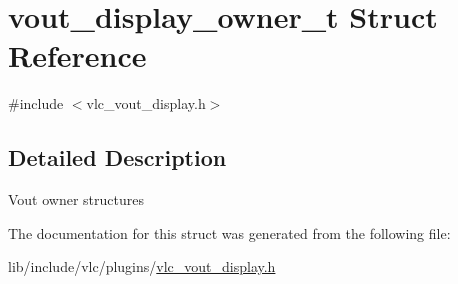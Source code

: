 \hypertarget{structvout__display__owner__t}{}\section{vout\+\_\+display\+\_\+owner\+\_\+t Struct Reference}
\label{structvout__display__owner__t}


{\ttfamily \#include $<$vlc\+\_\+vout\+\_\+display.\+h$>$}



\subsection{Detailed Description}
Vout owner structures 

The documentation for this struct was generated from the following file\+:\begin{DoxyCompactItemize}
\item 
lib/include/vlc/plugins/\hyperlink{vlc__vout__display_8h}{vlc\+\_\+vout\+\_\+display.\+h}\end{DoxyCompactItemize}
